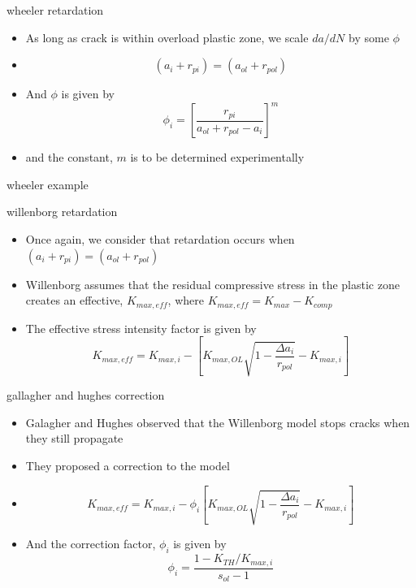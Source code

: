 \documentclass[10pt]{beamer}
\begin{document}
	\begin{frame}{wheeler retardation}
		\begin{itemize}[<+->]
			\item As long as crack is within overload plastic zone, we scale $da/dN$ by some $\phi$
			\item[] \begin{equation}
			(a_i + r_{pi}) = (a_{ol} + r_{pol})
			\end{equation}
			\item And $\phi$ is given by
			\begin{equation}
			\phi_i = \left[\frac{r_{pi}}{a_{ol}+r_{pol}-a_i}\right]^m
			\end{equation}
			\item and the constant, $m$ is to be determined experimentally
		\end{itemize}
	\end{frame}
	
	\begin{frame}{wheeler example}
		
	\end{frame}
	
	\begin{frame}{willenborg retardation}
		\begin{itemize}[<+->]
			\item Once again, we consider that retardation occurs when $(a_i + r_{pi}) = (a_{ol} + r_{pol})$
			\item Willenborg assumes that the residual compressive stress in the plastic zone creates an effective, $K_{max,eff}$, where $K_{max,eff} = K_{max} - K_{comp}$
			\item The effective stress intensity factor is given by
			\begin{equation}
			K_{max,eff} = K_{max,i} - \left[K_{max,OL}\sqrt{1-\frac{\Delta a_i}{r_{pol}}} - K_{max,i} \right]
			\end{equation} 
		\end{itemize}
	\end{frame}
	
	\begin{frame}{gallagher and hughes correction}
		\begin{itemize}[<+->]
			\item Galagher and Hughes observed that the Willenborg model stops cracks when they still propagate
			\item They proposed a correction to the model
			\item[] \begin{equation}
			K_{max,eff} = K_{max,i} - \phi_i\left[K_{max,OL}\sqrt{1-\frac{\Delta a_i}{r_{pol}}} - K_{max,i} \right]
			\end{equation} 
			\item And the correction factor, $\phi_i$ is given by
			\begin{equation}
			\phi_i = \frac{1-K_{TH}/K_{max,i}}{s_{ol}-1}
			\end{equation}
		\end{itemize}
	\end{frame}
	
\end{document}
